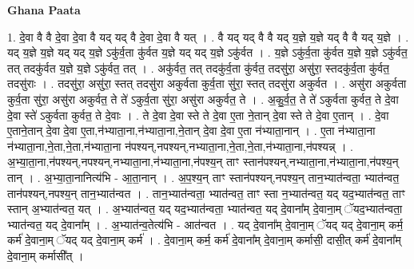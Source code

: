 \documentclass[17pt]{extarticle}
\begin{document}
\textbf{Ghana Paata } \newline

1. दे॒वा वै वै दे॒वा दे॒वा वै यद् यद् वै दे॒वा दे॒वा वै यत् । . वै यद् यद् वै वै यद् य॒ज्ञे य॒ज्ञे यद् वै वै यद् य॒ज्ञे । . यद् य॒ज्ञे य॒ज्ञे यद् यद् य॒ज्ञे ऽकु॑र्व॒ता कु॑र्वत य॒ज्ञे यद् यद् य॒ज्ञे ऽकु॑र्वत । . य॒ज्ञे ऽकु॑र्व॒ता कु॑र्वत य॒ज्ञे य॒ज्ञे ऽकु॑र्वत॒ तत् तदकु॑र्वत य॒ज्ञे य॒ज्ञे ऽकु॑र्वत॒ तत् । . अकु॑र्वत॒ तत् तदकु॑र्व॒ता कु॑र्वत॒ तदसु॑रा॒ असु॑रा॒ स्तदकु॑र्व॒ता कु॑र्वत॒ तदसु॑राः । . तदसु॑रा॒ असु॑रा॒ स्तत् तदसु॑रा अकुर्वता कुर्व॒ता सु॑रा॒ स्तत् तदसु॑रा अकुर्वत । . असु॑रा अकुर्वता कुर्व॒ता सु॑रा॒ असु॑रा अकुर्वत॒ ते ते॑ ऽकुर्व॒ता सु॑रा॒ असु॑रा अकुर्वत॒ ते । . अ॒कु॒र्व॒त॒ ते ते॑ ऽकुर्वता कुर्वत॒ ते दे॒वा दे॒वा स्ते॑ ऽकुर्वता कुर्वत॒ ते दे॒वाः । . ते दे॒वा दे॒वा स्ते ते दे॒वा ए॒ता ने॒तान् दे॒वा स्ते ते दे॒वा ए॒तान् । . दे॒वा ए॒ताने॒तान् दे॒वा दे॒वा ए॒ता,न॑भ्याता॒ना,न॑भ्याता॒ना,ने॒तान् दे॒वा दे॒वा ए॒ता न॑भ्याता॒नान् । . ए॒ता न॑भ्याता॒ना न॑भ्याता॒ना,ने॒ता,ने॒ता,न॑भ्याता॒ना न॑पश्यन्,नपश्यन्,नभ्याता॒ना,ने॒ता,ने॒ता,न॑भ्याता॒ना,न॑पश्यन्न् । . अ॒भ्या॒ता॒ना,न॑पश्यन्,नपश्यन्,नभ्याता॒ना,न॑भ्याता॒ना,न॑पश्य॒न् ताꣳ स्तान॑पश्यन्,नभ्याता॒ना,न॑भ्याता॒ना,न॑पश्य॒न् तान् । . अ॒भ्या॒ता॒नानित्य॑भि - आ॒ता॒नान् । . अ॒प॒श्य॒न् ताꣳ स्तान॑पश्यन्,नपश्य॒न् तान॒भ्यात॑न्वता॒ भ्यात॑न्वत॒ तान॑पश्यन्,नपश्य॒न् तान॒भ्यात॑न्वत । . तान॒भ्यात॑न्वता॒ भ्यात॑न्वत॒ ताꣳ स्ता न॒भ्यात॑न्वत॒ यद् यद॒भ्यात॑न्वत॒ ताꣳ स्तान् अ॒भ्यात॑न्वत॒ यत् । . अ॒भ्यात॑न्वत॒ यद् यद॒भ्यात॑न्वता॒ भ्यात॑न्वत॒ यद् दे॒वाना᳚म् दे॒वाना॒म् ॅयद॒भ्यात॑न्वता॒ भ्यात॑न्वत॒ यद् दे॒वाना᳚म् । . अ॒भ्यात॑न्व॒तेत्य॑भि - आत॑न्वत । . यद् दे॒वाना᳚म् दे॒वाना॒म् ॅयद् यद् दे॒वाना॒म् कर्म॒ कर्म॑ दे॒वाना॒म् ॅयद् यद् दे॒वाना॒म् कर्म॑ । . दे॒वाना॒म् कर्म॒ कर्म॑ दे॒वाना᳚म् दे॒वाना॒म् कर्मासी॒ दासी॒त् कर्म॑ दे॒वाना᳚म् दे॒वाना॒म् कर्मासी᳚त् । \newline
\end{document}
